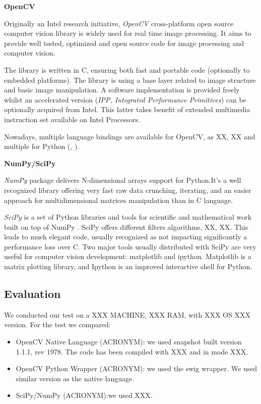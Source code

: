 \documentclass[english]{IEEEtran}
\theoremstyle{plain}
\begin{document}
\textbf{OpenCV}

Originally an Intel research initiative, \textit{OpenCV} cross-platform open
source computer vision library is widely used for real time image processing.
It aims to provide well tested, optimized and open source code for image
processing and computer vision. 

The library is written in C, ensuring both fast and portable code (optionally
to embedded platforms). The library is using a base layer related to image structure
and basic image manipulation. A software implementation is provided freely whilst an accelerated
version (\textit{IPP, Integrated Performance Primitives}\cite{}) can be optionally acquired 
from Intel. This latter takes benefit of extended multimedia instruction set available on 
Intel Processors.

Nowadays, multiple language bindings are available for OpenCV, as XX, XX and multiple
for Python (\cite{}, \cite{}).



\textbf{NumPy/SciPy}

\textit{NumPy} package delivers N-dimensional arrays support for Python\cite{oliphant2006guide}.It's a well
recognized library offering very fast raw data crunching, iterating, and an easier approach
for multidimensional matrices manipulation than in C language.

\textit{SciPy} \cite{jones2001scipy} is a set of Python libraries and tools
for scientific and mathematical work built on top of NumPy \cite{oliphant2007python}.
SciPy offers different filters algorithms, XX, XX. This leads to much elegant code, usually recognized as not impacting
significantly a performance loss over C. Two major tools usually distributed with
SciPy are very useful for computer vision development:  matplotlib and ipython. 
Matplotlib\cite{hunter2007matplotlib} is a matrix plotting library, and Ipython is an improved interactive shell for Python\cite{perez2007ipython}.

\subsection{Evaluation}

We conducted our test on a XXX MACHINE, XXX RAM, with XXX OS XXX version. For the test we compared:
\begin{itemize}
	\item OpenCV Native Language (ACRONYM): we used snapshot built version 1.1.1, rev 1978. The code
	has been compiled with XXX and in mode XXX.
	\item OpenCV Python Wrapper (ACRONYM): we used the swig\cite{beazley1996swig} wrapper. We used 
	similar version as the native language.
	\item SciPy/NumPy (ACRONYM):we used XXX.
\end{itemize}
\end{document}

